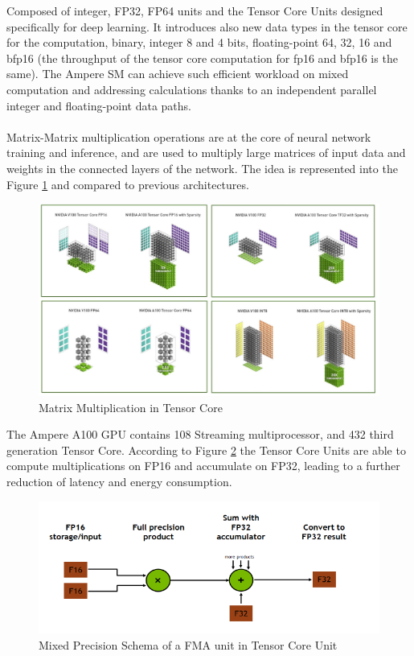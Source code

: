 Composed of integer, FP32, FP64 units and the Tensor Core Units designed specifically for deep learning. It introduces also new data types in the tensor core for the computation, binary, integer 8 and 4 bits, floating-point 64, 32, 16 and bfp16 (the throughput of the tensor core computation for fp16 and bfp16 is the same). The Ampere SM can achieve such efficient workload on mixed computation and addressing calculations thanks to an independent parallel integer and floating-point data paths. \\\\

Matrix-Matrix multiplication operations are at the core of neural network training and inference, and are used to multiply large matrices of input data and weights in the connected layers of the network. The idea is represented into the Figure \ref{fig:tensorcorevolta} and compared to previous architectures.

\begin{figure}[!htbp]
\centering
\captionsetup{justification=centering}
\includegraphics[scale=0.6]{./figure/tensor_core.PNG}
\caption{Matrix Multiplication in Tensor Core\cite{paper:41}}
\label{fig:tensorcorevolta}
\end{figure}

The Ampere A100 GPU contains 108 Streaming multiprocessor, and 432 third generation Tensor Core.
According to Figure \ref{fig:mixprec} the Tensor Core Units are able to compute multiplications on FP16 and accumulate on FP32, leading to a further reduction of latency and energy consumption.
\begin{figure}[!htbp]
\centering
\captionsetup{justification=centering}
\includegraphics[scale=0.8]{./figure/mix_prec.PNG}
\caption{Mixed Precision Schema of a FMA unit in Tensor Core Unit\cite{paper:41}}
\label{fig:mixprec}
\end{figure}

